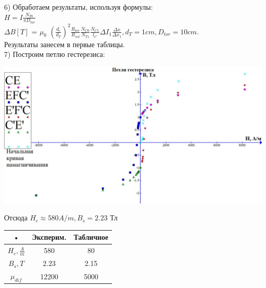 \documentclass[a4paper,12pt]{article} %
\begin{document}
 6) Обработаем результаты, используя формулы: \\
$H = I\frac{N_{T0}}{\pi D_{tor}}$\\
$\Delta B [T]$ = $\mu_0$ $(\frac{d_c}{d_T})^2  \frac{R_{tor}}{R_{sol}}  \frac{N_{C0}}{N_{T1}} \frac{N_{C1}}{l_C} \Delta I_1 \frac{\Delta x}{\Delta x_1}  , d_T=1 cm, D_{tor}=10 cm.$ \\
Результаты занесем в первые таблицы.\\
7) Построим петлю гестерезиса: \\
\begin{flushleft}


\includegraphics[scale=0.36]{3441}


\end{flushleft}




Отсюда $H_c\approx580 A/m, B_s=2.23$ Тл\\
\begin{center}

\begin{tabular}{|c|c|c|}
\hline 
• & Эксперим. & Табличное \\ 
\hline 
$H_c,  \frac{A}{m}$ & 580 & 80 \\ 
\hline 
$B_s, T$ & 2.23 & 2.15 \\ 
\hline 
$\mu_{dif}$ & 12200 & 5000 \\ 
\hline 
\end{tabular} 
\end{center}
\end{document}
